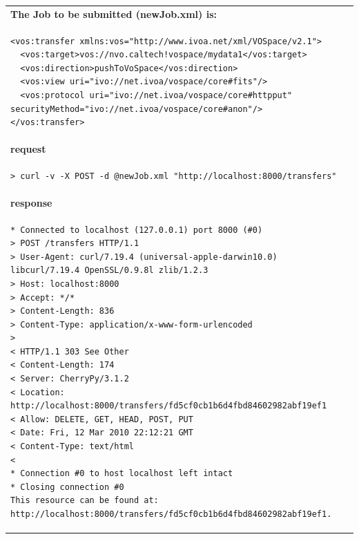 \documentclass[11pt,a4paper]{ivoa}
\begin{document}
\begin{tabular}{ p{10cm} }
\\
\textbf{The Job to be submitted (newJob.xml) is:} \\
\begin{lstlisting}
<vos:transfer xmlns:vos="http://www.ivoa.net/xml/VOSpace/v2.1">   
  <vos:target>vos://nvo.caltech!vospace/mydata1</vos:target>
  <vos:direction>pushToVoSpace</vos:direction>
  <vos:view uri="ivo://net.ivoa/vospace/core#fits"/>
  <vos:protocol uri="ivo://net.ivoa/vospace/core#httpput" securityMethod="ivo://net.ivoa/vospace/core#anon"/>
</vos:transfer>
\end{lstlisting} \\
\textbf{request} \\
\begin{lstlisting}
> curl -v -X POST -d @newJob.xml "http://localhost:8000/transfers"
\end{lstlisting} \\
\textbf{response} \\
\begin{lstlisting}
* Connected to localhost (127.0.0.1) port 8000 (#0)
> POST /transfers HTTP/1.1
> User-Agent: curl/7.19.4 (universal-apple-darwin10.0) libcurl/7.19.4 OpenSSL/0.9.8l zlib/1.2.3
> Host: localhost:8000
> Accept: */*
> Content-Length: 836
> Content-Type: application/x-www-form-urlencoded
> 
< HTTP/1.1 303 See Other
< Content-Length: 174
< Server: CherryPy/3.1.2
< Location: http://localhost:8000/transfers/fd5cf0cb1b6d4fbd84602982abf19ef1
< Allow: DELETE, GET, HEAD, POST, PUT
< Date: Fri, 12 Mar 2010 22:12:21 GMT
< Content-Type: text/html
< 
* Connection #0 to host localhost left intact
* Closing connection #0
This resource can be found at: http://localhost:8000/transfers/fd5cf0cb1b6d4fbd84602982abf19ef1.
\end{lstlisting} \\
\end{tabular}
\end{document}
